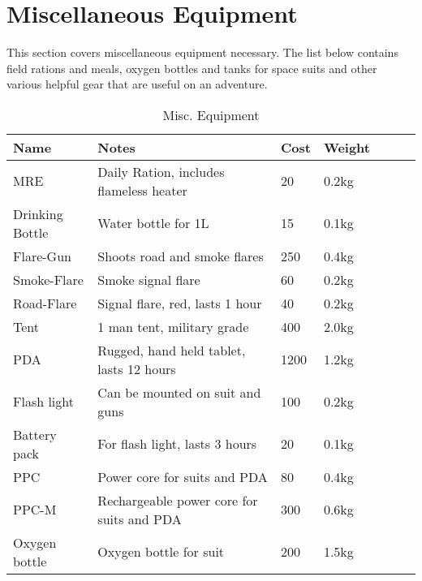 \section{Miscellaneous Equipment}

This section covers miscellaneous equipment necessary. The list below contains
field rations and meals, oxygen bottles and tanks for space suits and other
various helpful gear that are useful on an adventure.

\begin{table}
  \caption{Misc. Equipment}
  \label{tab:MiscEquipment}
  \begin{center}
    \begin{tabular}{| l | l | l | l | l | l | l |}

      \hline
      \textbf{Name} & \textbf{Notes} & \textbf{Cost} & \textbf{Weight} \\ \hline

      MRE             & Daily Ration, includes flameless heater  &   20 & 0.2kg \\ \hline
      Drinking Bottle & Water bottle for 1L                      &   15 & 0.1kg \\ \hline

      Flare-Gun       & Shoots road and smoke flares             &  250 & 0.4kg \\ \hline
      Smoke-Flare     & Smoke signal flare                       &   60 & 0.2kg \\ \hline
      Road-Flare      & Signal flare, red, lasts 1 hour          &   40 & 0.2kg \\ \hline

      Tent            & 1 man tent, military grade               &  400 & 2.0kg \\ \hline

      PDA             & Rugged, hand held tablet, lasts 12 hours & 1200 & 1.2kg \\ \hline

      Flash light     & Can be mounted on suit and guns          &  100 & 0.2kg \\ \hline

      Battery pack    & For flash light, lasts 3 hours           &   20 & 0.1kg \\ \hline
      PPC             & Power core for suits and PDA             &   80 & 0.4kg \\ \hline
      PPC-M           & Rechargeable power core for suits and PDA & 300 & 0.6kg \\ \hline
      Oxygen bottle   & Oxygen bottle for suit                   &  200 & 1.5kg \\ \hline

    \end{tabular}
  \end{center}
\end{table}
